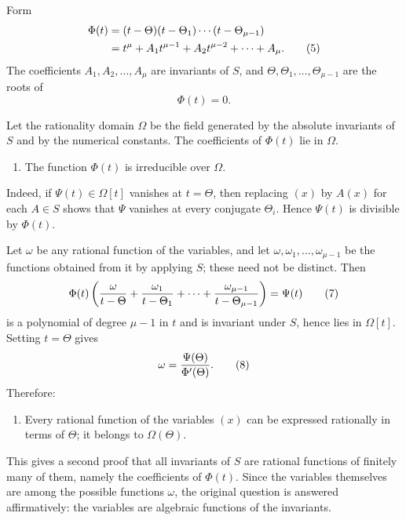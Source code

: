 \documentclass[11pt]{article}
\begin{document}
Form
\begin{align}
\Phi(t)&=(t-\Theta)(t-\Theta_1)\cdots(t-\Theta_{\mu-1})\notag\\
&=t^\mu+A_1t^{\mu-1}+A_2t^{\mu-2}+\cdots+A_\mu.
\tag{5}
\end{align}
The coefficients $A_1,A_2,\ldots,A_\mu$ are invariants of $S$, and $\Theta,\Theta_1,\ldots,\Theta_{\mu-1}$ are the roots of
\begin{equation}
\Phi(t)=0.
\tag{6}
\end{equation}

Let the rationality domain $\Omega$ be the field generated by the absolute invariants of $S$ and by the numerical constants. The coefficients of $\Phi(t)$ lie in $\Omega$.
\begin{enumerate}[label=\arabic*.,leftmargin=2.2em,start=3]
\item The function $\Phi(t)$ is irreducible over $\Omega$.
\end{enumerate}
Indeed, if $\Psi(t)\in\Omega[t]$ vanishes at $t=\Theta$, then replacing $(x)$ by $A(x)$ for each $A\in S$ shows that $\Psi$ vanishes at every conjugate $\Theta_i$. Hence $\Psi(t)$ is divisible by $\Phi(t)$.

Let $\omega$ be any rational function of the variables, and let $\omega,\omega_1,\ldots,\omega_{\mu-1}$ be the functions obtained from it by applying $S$; these need not be distinct. Then
\begin{equation}
\Phi(t)\left({\omega\over t-\Theta}+{\omega_1\over t-\Theta_1}+\cdots+{\omega_{\mu-1}\over t-\Theta_{\mu-1}}\right)=\Psi(t)
\tag{7}
\end{equation}
is a polynomial of degree $\mu-1$ in $t$ and is invariant under $S$, hence lies in $\Omega[t]$. Setting $t=\Theta$ gives
\begin{equation}
\omega={\Psi(\Theta)\over\Phi'(\Theta)}.
\tag{8}
\end{equation}
Therefore:
\begin{enumerate}[label=\arabic*.,leftmargin=2.2em,start=4]
\item Every rational function of the variables $(x)$ can be expressed rationally in terms of $\Theta$; it belongs to $\Omega(\Theta)$.
\end{enumerate}

This gives a second proof that all invariants of $S$ are rational functions of finitely many of them, namely the coefficients of $\Phi(t)$. Since the variables themselves are among the possible functions $\omega$, the original question is answered affirmatively: the variables are algebraic functions of the invariants.
\end{document}
